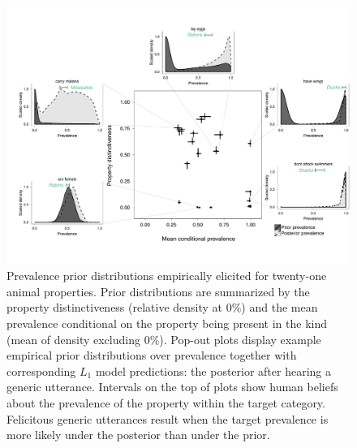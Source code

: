 \documentclass[10pt,letterpaper]{article}
\newcommand{\ndg}[1]{\textcolor{Green}{[ndg: #1]}}
\begin{document}
\begin{figure}
\centering
    \includegraphics[width=\columnwidth]{prevalence-scatter-wDists.pdf}
    \caption{Prevalence prior distributions empirically elicited for twenty-one animal properties.
    Prior distributions are summarized by the property distinctiveness (relative density at 0\%) and the mean prevalence conditional on the property being present in the kind (mean of density excluding 0\%).
    Pop-out plots display example empirical prior distributions over prevalence together with corresponding $L_1$ model predictions: the posterior after hearing a generic utterance. 
    Intervals on the top of plots show human beliefs about the prevalence of the property within the target category.
    Felicitous generic utterances result when the target prevalence is more likely under the posterior than under the prior.
    }
  \label{fig:priors1a}
\end{figure}
\end{document}

